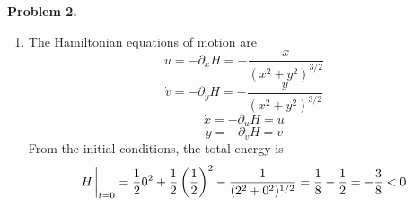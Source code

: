 \documentclass{article}
\def\tbf#1{\textbf{#1}}
\newcommand{\br}[1]{\left(#1\right)}
\newcommand{\ptl}{\partial}
\begin{document}
\tbf{Problem 2.}

\begin{enumerate}[label=(\alph*)]
	
\item The Hamiltonian equations of motion are
$$\dot u = -\ptl_xH = -\frac{x}{(x^2+y^2)^{3/2}}$$
$$\dot v = -\ptl_yH = -\frac{y}{(x^2+y^2)^{3/2}}$$
$$\dot x = -\ptl_uH = u$$
$$\dot y = -\ptl_vH = v$$
From the initial conditions, the total energy is
$$H\eval_{t=0} = \frac120^2 + \frac12\br{\frac12}^2 - \frac{1}{(2^2+0^2)^{1/2}} = \frac18 - \frac12 = -\frac38 < 0$$
\end{enumerate}
	
\end{document}

